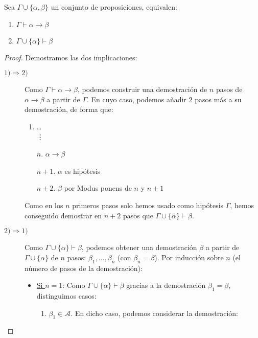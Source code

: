 \begin{teo}\label{teo:herbrand}
    Sea $\Gamma\cup\{\alpha,\beta\}$ un conjunto de proposiciones, equivalen:
    \begin{enumerate}
        \item $\Gamma\vdash \alpha\to\beta$
        \item $\Gamma\cup\{\alpha\}\vdash \beta$
    \end{enumerate}
    \begin{proof}
        Demostramos las dos implicaciones:
        \begin{description}
            \item [$1) \Longrightarrow 2)$]
                Como $\Gamma\vdash \alpha\to\beta$, podemos construir una demostración de $n$ pasos de $\alpha\to\beta$ a partir de $\Gamma$. En cuyo caso, podemos añadir 2 pasos más a su demostración, de forma que:
                \begin{enumerate}
                    \item \ldots \\
                        \vdots 
                    \item[$n$.] $\alpha\to\beta$
                    \item[$n+1$.] $\alpha$ es hipótesis
                    \item[$n+2$.] $\beta$ por Modus ponens de $n$ y $n+1$
                \end{enumerate}
                Como en los $n$ primeros pasos solo hemos usado como hipótesis $\Gamma$, hemos conseguido demostrar en $n+2$ pasos que $\Gamma\cup\{\alpha\}\vdash \beta$.
            \item [$2) \Longrightarrow 1)$] 
                Como $\Gamma\cup\{\alpha\}\vdash \beta$, podemos obtener una demostración $\beta$ a partir de $\Gamma\cup\{\alpha\}$ de $n$ pasos: $\beta_1,\ldots,\beta_n$ (con $\beta_n=\beta$). Por inducción sobre $n$ (el número de pasos de la demostración):
                \begin{itemize}
                    \item \underline{Si $n=1$}: Como $\Gamma\cup\{\alpha\}\vdash \beta$ gracias a la demostración $\beta_1=\beta$, distinguimos casos:
                        \begin{enumerate}[label=(\alph*)]
                            \item $\beta_1\in \mathcal{A}$. En dicho caso, podemos considerar la demostración:
                                \begin{enumerate}[label=\arabic*.]

\end{enumerate}
\end{enumerate}
\end{itemize}
\end{description}
\end{proof}
\end{teo}
